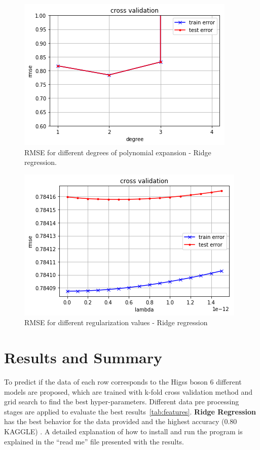 \documentclass[10pt,conference,compsocconf]{IEEEtran}
\begin{document}
\begin{figure}[H]
  \centering
  \includegraphics[width=\columnwidth]{cross_validation_degree}
  \caption{RMSE for different degrees of polynomial expansion - Ridge regression.}
  \vspace{-3mm}
  \label{fig:best_degree}
\end{figure}


\begin{figure}[H]
  \centering
  \includegraphics[width=\columnwidth]{cross_validation_lambda}
  \caption{RMSE for different regularization values - Ridge regression}
  \vspace{-3mm}
  \label{fig:best_lambda}
\end{figure}



\section{Results and Summary}
To predict if the data of each row corresponds to the Higss boson
6 different models are proposed, which are trained with k-fold cross validation
method and grid search to find the best hyper-parameters. 
Different data pre processing stages are applied to evaluate the best results~\ref{tab:features}. 
\textbf{Ridge Regression} has the best behavior for the data provided and 
the highest accuracy (0.80 KAGGLE) .
A detailed explanation of how to install and run the program is explained
in the ``read me'' file presented with the results.




\end{document}

